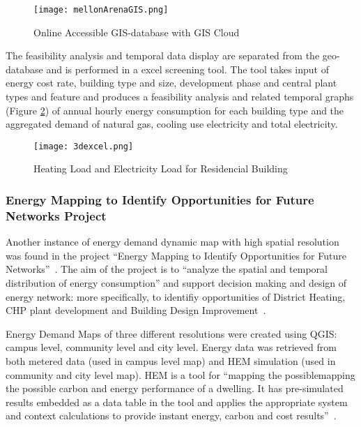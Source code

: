 \documentclass[hidelinks,12pt]{article}
\newcommand{\fref}[1]{Figure \ref{#1}}
\begin{document}
\begin{figure}[h!]
  \centering
  \texttt{[image: mellonArenaGIS.png]}
  \caption{Online Accessible GIS-database with GIS
    Cloud~\cite{baird2014, Ramesh2013}}
  \label{fig:mellonArenaGIS}
\end{figure}

The feasibility analysis and temporal data display are separated from
the geo-database and is performed in a excel screening tool. The tool
takes input of energy cost rate, building type and size, development
phase and central plant types and feature and produces a feasibility
analysis and related temporal graphs (\fref{fig:3dexcel}) of annual
hourly energy consumption for each building type and the aggregated
demand of natural gas, cooling use electricity and total electricity.

\begin{figure}[h!]
  \centering
  \texttt{[image: 3dexcel.png]}
  \caption{Heating Load and Electricity Load for Residencial
    Building~\cite{baird2014}}
  \label{fig:3dexcel}
\end{figure}

\subsubsection{Energy Mapping to Identify Opportunities for Future
  Networks Project}
Another instance of energy demand dynamic map with high spatial
resolution was found in the project ``Energy Mapping to Identify
Opportunities for Future Networks''~\cite{Diaz2013}. The aim of the
project is to ``analyze the spatial and temporal distribution of
energy consumption'' and support decision making and design of energy
network: more specifically, to identifiy opportunities of District
Heating, CHP plant development and Building Design
Improvement~\cite{Diaz2013}.

Energy Demand Maps of three different resolutions were created using
QGIS: campus level, community level and city level. Energy data was
retrieved from both metered data (used in campus level map) and HEM
simulation (used in community and city level map). HEM is a tool for
``mapping the possiblemapping the possible carbon and energy
performance of a dwelling. It has pre-simulated results embedded as a
data table in the tool and applies the appropriate system and context
calculations to provide instant energy, carbon and cost results''~\cite{HEMesru2015}.
\end{document}
